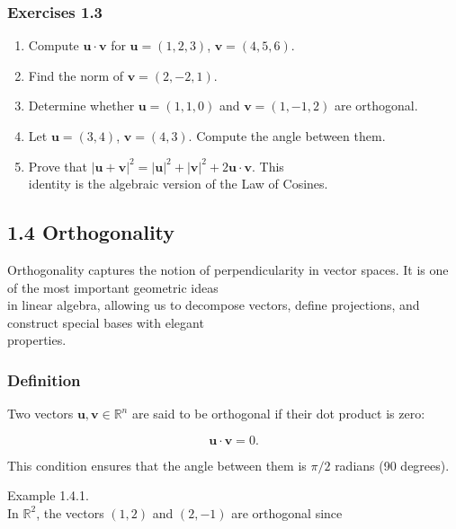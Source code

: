 \documentclass[
  12pt,
  a4paper,
]{article}
\begin{document}
\subsubsection{Exercises 1.3}\label{exercises-13}

\begin{enumerate}
\def\labelenumi{\arabic{enumi}.}
\item
  Compute \(\mathbf{u} \cdot \mathbf{v}\) for \(\mathbf{u} = (1,2,3)\),
  \(\mathbf{v} = (4,5,6)\).
\item
  Find the norm of \(\mathbf{v} = (2, -2, 1)\).
\item
  Determine whether \(\mathbf{u} = (1,1,0)\) and
  \(\mathbf{v} = (1,-1,2)\) are orthogonal.
\item
  Let \(\mathbf{u} = (3,4)\), \(\mathbf{v} = (4,3)\). Compute the angle
  between them.
\item
  Prove that
  \(|\mathbf{u} + \mathbf{v}|^2 = |\mathbf{u}|^2 + |\mathbf{v}|^2 + 2\mathbf{u}\cdot \mathbf{v}\).
  This\\
  identity is the algebraic version of the Law of Cosines.
\end{enumerate}

\subsection{1.4 Orthogonality}\label{14-orthogonality}

Orthogonality captures the notion of perpendicularity in vector spaces.
It is one of the most important geometric ideas\\
in linear algebra, allowing us to decompose vectors, define projections,
and construct special bases with elegant\\
properties.

\subsubsection{Definition}\label{definition}

Two vectors \(\mathbf{u}, \mathbf{v} \in \mathbb{R}^n\) are said to be
orthogonal if their dot product is zero:

\[\mathbf{u} \cdot \mathbf{v} = 0.\]

This condition ensures that the angle between them is \(\pi/2\) radians
(90 degrees).

Example 1.4.1.\\
In \(\mathbb{R}^2\), the vectors \((1,2)\) and \((2,-1)\) are orthogonal
since
\end{document}
